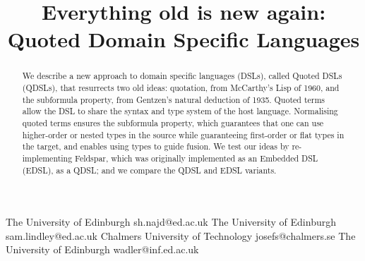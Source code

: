 \documentclass[authoryear,9pt]{sigplanconf}
\begin{document}

\title{Everything old is new again:\\
       Quoted Domain Specific Languages}

           {The University of Edinburgh}
           {sh.najd@ed.ac.uk}
           {The University of Edinburgh}
           {sam.lindley@ed.ac.uk}
           {Chalmers University of Technology}
           {josefs@chalmers.se}
           {The University of Edinburgh}
           {wadler@inf.ed.ac.uk}


\maketitle

\begin{abstract}

We describe a new approach to domain specific languages (DSLs), called
Quoted DSLs (QDSLs), that resurrects two old ideas: quotation, from
McCarthy's Lisp of 1960, and the subformula property, from Gentzen's
natural deduction of 1935.  Quoted terms allow the DSL to share the
syntax and type system of the host language.  Normalising quoted terms
ensures the subformula property, which guarantees that one can use
higher-order or nested types in the source while guaranteeing
first-order or flat types in the target, and enables using types to
guide fusion.  We test our ideas by re-implementing Feldspar, which
was originally implemented as an Embedded DSL (EDSL), as a QDSL; and
we compare the QDSL and EDSL variants.

\end{abstract}
\end{document}
